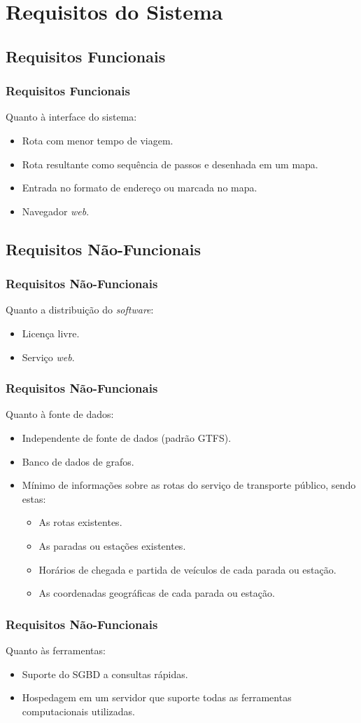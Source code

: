 \section{Requisitos do Sistema}

\subsection{Requisitos Funcionais}
\frame
{
\frametitle{Requisitos Funcionais}
Quanto à interface do sistema:
\begin{itemize}
	\item Rota com menor tempo de viagem.
	\item Rota resultante como sequência de passos e desenhada em um mapa.
	\item Entrada no formato de endereço ou marcada no mapa.
	\item Navegador \emph{web}.
\end{itemize}
}

\subsection{Requisitos Não-Funcionais}
\frame
{
\frametitle{Requisitos Não-Funcionais}
Quanto a distribuição do \emph{software}:
\begin{itemize}
	\item Licença livre.
	\item Serviço \emph{web}.
\end{itemize}
}

\frame
{
\frametitle{Requisitos Não-Funcionais}
Quanto à fonte de dados:
\begin{itemize}
	\item Independente de fonte de dados (padrão GTFS).
	\item Banco de dados de grafos.
	\item Mínimo de informações sobre as rotas do serviço de transporte público, sendo estas:
	\begin{itemize}
		\item As rotas existentes.
		\item As paradas ou estações existentes.
		\item Horários de chegada e partida de veículos de cada parada ou estação.
		\item As coordenadas geográficas de cada parada ou estação.
	\end{itemize}
\end{itemize}
}

\frame
{
\frametitle{Requisitos Não-Funcionais}
Quanto às ferramentas:
\begin{itemize}
	\item Suporte do SGBD a consultas rápidas.
	\item Hospedagem em um servidor que suporte todas as ferramentas computacionais utilizadas.
\end{itemize}
}
